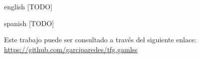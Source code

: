 \documentclass{subfiles}
\newenvironment{abstractpage}
  {\cleardoublepage\vspace*{\fill}\thispagestyle{empty}}
  {\vfill\cleardoublepage}
\newenvironment{abstract-lang}[1]
  {\bigskip\selectlanguage{#1}%
   \begin{center}\bfseries\abstractname\end{center}}
  {\par\bigskip}
\begin{document}
  \begin{abstractpage}
    \begin{abstract-lang}{english}
      [TODO]
    \end{abstract-lang}
    \begin{abstract-lang}{spanish}
      [TODO]
    \end{abstract-lang}

    \centering
    Este trabajo puede ser consultado a través del siguiente enlace: \url{https://github.com/garciparedes/tfg.gamlss}

  \end{abstractpage}
\end{document}
